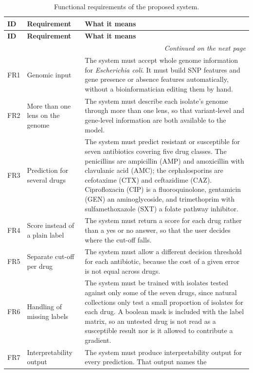 {\small\setlength{\tabcolsep}{5pt}
\begin{longtable}{|l|>{\raggedright\arraybackslash}p{3.0cm}|>{\raggedright\arraybackslash}p{9.8cm}|}
\caption{Functional requirements of the proposed system.}
\label{tab:funcreq}\\
\hline
\textbf{ID} & \textbf{Requirement} & \textbf{What it means} \\
\hline
\endfirsthead
\hline
\textbf{ID} & \textbf{Requirement} & \textbf{What it means} \\
\hline
\endhead
\hline
\multicolumn{3}{r}{\footnotesize\textit{Continued on the next page}}\\
\endfoot
\hline
\endlastfoot
FR1 & Genomic input &
The system must accept whole genome information for \textit{Escherichia coli}. It must build
SNP features and gene presence or absence features automatically, without a bioinformatician
editing them by hand. \\
\hline
FR2 & More than one lens on the genome &
The system must describe each isolate's genome through more than one lens, so that
variant-level and gene-level information are both available to the model. \\
\hline
FR3 & Prediction for several drugs &
The system must predict resistant or susceptible for seven antibiotics covering five drug
classes. The penicillins are ampicillin (AMP) and amoxicillin with clavulanic acid (AMC); the
cephalosporins are cefotaxime (CTX) and ceftazidime (CAZ). Ciprofloxacin (CIP) is a
fluoroquinolone, gentamicin (GEN) an aminoglycoside, and trimethoprim with sulfamethoxazole
(SXT) a folate pathway inhibitor. \\
\hline
FR4 & Score instead of a plain label &
The system must return a score for each drug rather than a yes or no answer, so that the user
decides where the cut-off falls. \\
\hline
FR5 & Separate cut-off per drug &
The system must allow a different decision threshold for each antibiotic, because the cost of
a given error is not equal across drugs. \\
\hline
FR6 & Handling of missing labels &
The system must be trained with isolates tested against only some of the seven drugs, since
natural collections only test a small proportion of isolates for each drug. A boolean mask is
included with the label matrix, so
an untested drug is not read as a susceptible result nor is it allowed to contribute a
gradient. \\
\hline
FR7 & Interpretability output &
The system must produce interpretability output for every prediction. That output names the

\end{longtable}}
